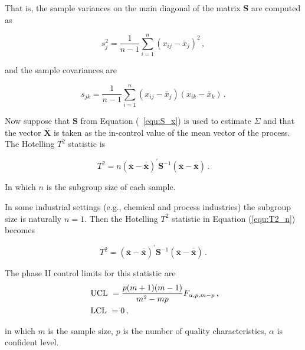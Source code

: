 That is, the sample variances on the main diagonal of the matrix $\mathbf{S}$ are computed as

\begin{equation}
s_{j}^{2}=\frac{1}{n-1} \sum_{i=1}^{n}\left(x_{i j}-\bar{x}_{j}\right)^{2}\,,
\label{equ:S_j}
\end{equation}

and the sample covariances are

\begin{equation}
s_{j k}=\frac{1}{n-1} \sum_{i=1}^{n}\left(x_{i j}-\bar{x}_{j}\right)\left(x_{i k}-\bar{x}_{k}\right)\,.
\label{equ:S_ij}
\end{equation}

Now suppose that $\mathbf{S}$ from Equation (~\ref{equ:S_x}) is used to estimate
$\Sigma$ and that the vector ${\overline{\mathbf{X}}}$ is taken as the in-control value of the mean vector of the process. The Hotelling $T^{2}$ statistic is

\begin{equation}
T^{2}=n(\overline{\mathbf{x}}-\overline{\overline{\mathbf{x}}})^{\prime} \mathbf{S}^{-1}(\overline{\mathbf{x}}-\overline{\overline{\mathbf{x}}})\,.
\label{equ:T2_n}
\end{equation}

In which $n$ is the subgroup size of each sample.

In some industrial settings (e.g., chemical and process industries) the subgroup size is naturally $n = 1$. Then the Hotelling $T^{2}$ statistic in Equation
(\ref{equ:T2_n}) becomes

\begin{equation}
T^{2}=(\overline{\mathbf{x}}-\overline{\overline{\mathbf{x}}})^{\prime} \mathbf{S}^{-1}(\overline{\mathbf{x}}-\overline{\overline{\mathbf{x}}})\,.
\label{equ:T2}
\end{equation}

The phase II control limits for this statistic are
\begin{equation}
\begin{aligned}
\centering&\text { UCL }=\frac{p(m+1)(m-1)}{m^{2}-m p} F_{\alpha, p, m-p}\,, \\
\centering&\text { LCL }=0\,,
\label{equ:UCL_T2}
\end{aligned}
\end{equation}

in which $m$ is the sample size, $p$ is the number of quality characteristics, $\alpha$ is confident level.








































